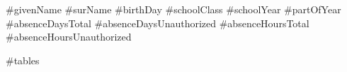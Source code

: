 \documentclass[11pt,a4paper]{article}
\begin{document}
#givenName
#surName
#birthDay
#schoolClass
#schoolYear
#partOfYear
#absenceDaysTotal
#absenceDaysUnauthorized
#absenceHoursTotal
#absenceHoursUnauthorized

#tables
\end{document}
